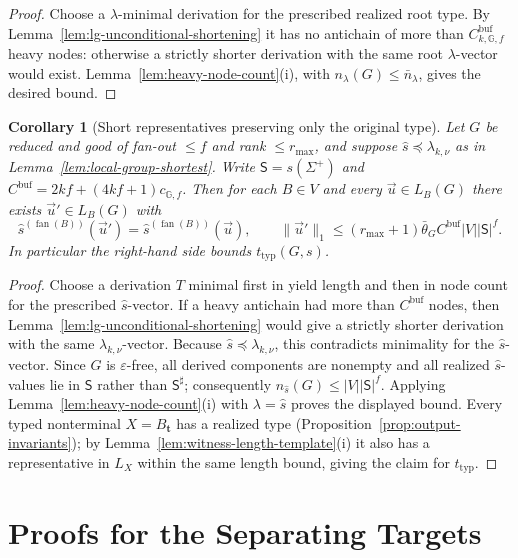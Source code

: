 \documentclass[11pt]{article}
\numberwithin{equation}{section}
\theoremstyle{plain}
\newtheorem{corollary}[theorem]{Corollary}
\theoremstyle{definition}
\theoremstyle{remark}
\newcommand{\tuple}[1]{\vec{#1}}
\newcommand{\eps}{\varepsilon}
\newcommand{\fan}{\operatorname{fan}}
\theoremstyle{plain}
\begin{document}
\begin{proof}
Choose a $\lambda$-minimal derivation for the prescribed realized
root type. By Lemma~\ref{lem:lg-unconditional-shortening} it
has no antichain of more than
$C^{\mathrm{buf}}_{k,\mathbb G,f}$ heavy nodes: otherwise a
strictly shorter derivation with the same root $\lambda$-vector
would exist. Lemma~\ref{lem:heavy-node-count}(i), with
$n_\lambda(G)\le\bar n_\lambda$, gives the desired bound.
\end{proof}

\begin{corollary}[Short representatives preserving only the original type]
\label{cor:lg-type-level-shortest}
Let $G$ be reduced and good of fan-out $\le f$ and rank $\le r_{\max}$,
and suppose $\widehat s\preceq\lambda_{k,\nu}$ as in
Lemma~\ref{lem:local-group-shortest}.  Write $\mathsf S=s(\Sigma^+)$ and
$C^{\mathrm{buf}}=2kf+(4kf+1)c_{{\mathbb G},f}$.  Then for each $B\in V$
and every $\tuple u\in L_B(G)$ there exists $\tuple u'\in L_B(G)$ with
\[
 \widehat s^{(\fan(B))}(\tuple u')=
 \widehat s^{(\fan(B))}(\tuple u),\qquad
 \|\tuple u'\|_1\le
 (r_{\max}+1)\bar\theta_G C^{\mathrm{buf}}|V||\mathsf S|^f.
\]
In particular the right-hand side bounds $t_{\mathrm{typ}}(G,s)$.
\end{corollary}

\begin{proof}
Choose a derivation $T$ minimal first in yield length and then
in node count for the prescribed $\widehat s$-vector. If a heavy
antichain had more than $C^{\mathrm{buf}}$ nodes, then
Lemma~\ref{lem:lg-unconditional-shortening} would give a
strictly shorter derivation with the same $\lambda_{k,\nu}$-vector.
Because $\widehat s\preceq\lambda_{k,\nu}$, this contradicts
minimality for the $\widehat s$-vector. Since $G$ is $\eps$-free,
all derived components are nonempty and all realized
$\widehat s$-values lie in $\mathsf S$ rather than
$\mathsf S^\sharp$; consequently
$n_{\widehat s}(G)\le|V||\mathsf S|^f$.
Applying Lemma~\ref{lem:heavy-node-count}(i) with
$\lambda=\widehat s$ proves the displayed bound.
Every typed nonterminal $X=B_{\mathbf t}$ has a realized type
(Proposition~\ref{prop:output-invariants}); by
Lemma~\ref{lem:witness-length-template}(i) it also has a
representative in $L_X$ within the same length bound, giving
the claim for $t_{\mathrm{typ}}$.
\end{proof}

\section{Proofs for the Separating Targets}
\label{app:separating-targets}
\end{document}
